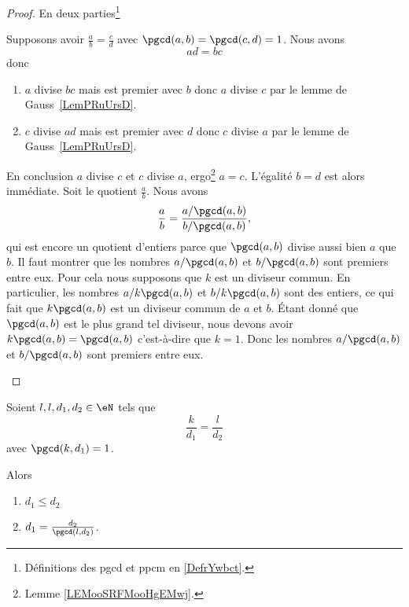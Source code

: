 \begin{proof}
	En deux parties\footnote{Définitions des pgcd et ppcm en \ref{DefrYwbct}.}
	\begin{subproof}
		\spitem[Unicité]
		Supposons avoir \( \frac{ a }{ b }=\frac{ c }{ d }\) avec \( \pgcd(a,b)=\pgcd(c,d)=1\). Nous avons
		\begin{equation}
			ad=bc
		\end{equation}
		donc
		\begin{enumerate}
			\item
			      \( a\) divise \( bc\) mais est premier avec \( b\) donc \( a\) divise \( c\) par le lemme de Gauss~\ref{LemPRuUrsD}.
			\item
			      \( c\) divise \( ad\) mais est premier avec \( d\) donc \( c\) divise \( a\) par le lemme de Gauss~\ref{LemPRuUrsD}.
		\end{enumerate}
		En conclusion \( a\) divise \( c\) et \( c\) divise \( a\), ergo\footnote{Lemme \ref{LEMooSRFMooHgEMwj}.} \( a=c\). L'égalité \( b=d\) est alors immédiate.
		\spitem[Existence]
		Soit le quotient \( \frac{ a }{ b }\). Nous avons
		\begin{equation}
			\frac{ a }{ b }=\frac{ a/\pgcd(a,b) }{ b/\pgcd(a,b) },
		\end{equation}
		qui est encore un quotient d'entiers parce que \( \pgcd(a,b)\) divise aussi bien \( a\) que \( b\). Il faut montrer que les nombres \( a/\pgcd(a,b)\) et \( b/\pgcd(a,b)\) sont premiers entre eux. Pour cela nous supposons que \( k\) est un diviseur commun. En particulier, les nombres \( a/k\pgcd(a,b)\) et \( b/k\pgcd(a,b)\) sont des entiers, ce qui fait que \( k\pgcd(a,b)\) est un diviseur commun de \( a\) et \( b\). Étant donné que \( \pgcd(a,b)\) est le plus grand tel diviseur, nous devons avoir \( k\pgcd(a,b)=\pgcd(a,b)\) c'est-à-dire que \( k=1\). Donc les nombres \( a/\pgcd(a,b)\) et \( b/\pgcd(a,b)\) sont premiers entre eux.
	\end{subproof}
\end{proof}

\begin{proposition}		\label{PROPooWBFJooWisSZX}
	Soient \( l,l,d_1,d_2\in \eN\) tels que
	\begin{equation}
		\frac{ k }{ d_1 }=\frac{ l }{ d_2 }
	\end{equation}
	avec \( \pgcd(k,d_1)=1\).

	Alors
	\begin{enumerate}
		\item
		      \( d_1\leq d_2\)
		\item
		      \( d_1=\frac{ d_2 }{ \pgcd(l,d_2) }\).
	\end{enumerate}
\end{proposition}


